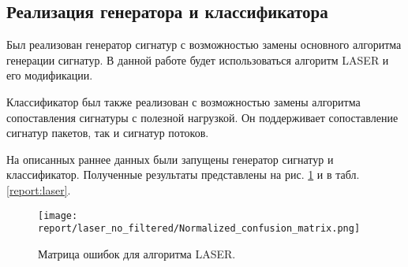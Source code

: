 \subsection{Реализация генератора и классификатора}

Был реализован генератор сигнатур с возможностью замены основного алгоритма генерации сигнатур.
В данной работе будет использоваться алгоритм LASER и его модификации.

Классификатор был также реализован с возможностью замены алгоритма сопоставления сигнатуры с полезной нагрузкой.
Он поддерживает сопоставление сигнатур пакетов, так и сигнатур потоков.

На описанных раннее данных были запущены генератор сигнатур и классификатор. Полученные результаты представлены на рис. \ref{matrix:laser} и в табл. \ref{report:laser}.

\begin{figure}[H]
    \begin{center}
        \texttt{[image: report/laser\_no\_filtered/Normalized\_confusion\_matrix.png]}
        \caption{Матрица ошибок для алгоритма LASER.}
        \label{matrix:laser}
    \end{center}
\end{figure}

\begin{table}[ht!]
    \caption{Результаты классификации для алгоритма LASER.}
    \label{report:laser}
    \centering
\end{table}

